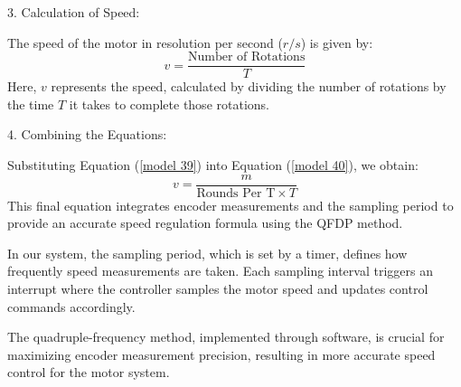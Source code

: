 \documentclass[journal,onecolumn]{IEEEtran}
\begin{document}
3. Calculation of Speed:

   The speed of the motor in resolution per second (\( r/s \)) is given by:
   \begin{equation}
       \label{model 39}
       v = \frac{\text{Number of Rotations}}{T}
   \end{equation}
   Here, \( v \) represents the speed, calculated by dividing the number of rotations by the time \( T \) it takes to complete those rotations.

4. Combining the Equations:

   Substituting Equation (\ref{model 39}) into Equation (\ref{model 40}), we obtain:
   \begin{equation}
       \label{model 40}
       v = \frac{m}{\text{Rounds Per T} \times T}
   \end{equation}
   This final equation integrates encoder measurements and the sampling period to provide an accurate speed regulation formula using the QFDP method.

In our system, the sampling period, which is set by a timer, defines how frequently speed measurements are taken. Each sampling interval triggers an interrupt where the controller samples the motor speed and updates control commands accordingly.

The quadruple-frequency method, implemented through software, is crucial for maximizing encoder measurement precision, resulting in more accurate speed control for the motor system.




\end{document}
